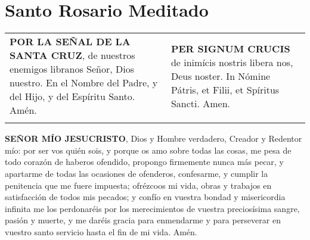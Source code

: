 \documentclass[./main.tex]{subfiles}
\begin{document}
\chapter*{Santo Rosario Meditado}

\begin{longtable} { p{} p{} }
      \label{crossSignal}
      \textbf{POR LA SEÑAL DE LA SANTA CRUZ}, de nuestros enemigos libranos Señor, Dios nuestro. En el Nombre del Padre,
      y del Hijo, y del Espíritu Santo. Amén.
  
          &
  
      \textbf{PER SIGNUM CRUCIS} de inimícis nostris libera nos, Deus noster. In Nómine Pátris, et Filii, et Spíritus Sancti. Amen.\\\\
\end{longtable}

\label{contrition}
\textbf{SEÑOR MÍO JESUCRISTO}, Dios y Hombre verdadero, Creador y Redentor mío: por ser vos quién sois, y porque os amo sobre todas las cosas,
me pesa de todo corazón de haberos ofendido, propongo firmemente nunca más pecar, y apartarme de todas las ocasiones de ofenderos,
confesarme, y cumplir la penitencia que me fuere impuesta; ofrézcoos mi vida, obras y trabajos en satisfacción de todos mis pecados;
y confío en vuestra bondad y misericordia infinita me los perdonaréis por los merecimientos de vuestra preciosísima sangre, pasión y muerte,
y me daréis gracia para enmendarme y para perseverar en vuestro santo servicio hasta el fin de mi vida. Amén.
\end{document}

